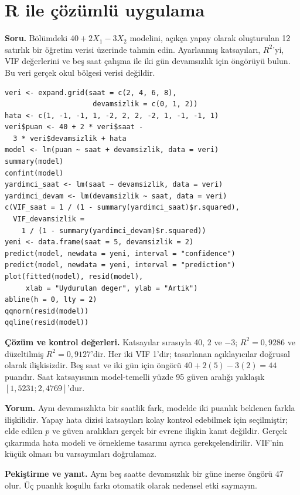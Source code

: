 \section{R ile çözümlü uygulama}
\label{sec:r-multiple}

\textbf{Soru.} Bölümdeki $40+2X_1-3X_2$ modelini, açıkça yapay olarak
oluşturulan 12 satırlık bir öğretim verisi üzerinde tahmin edin. Ayarlanmış
katsayıları, $R^2$'yi, VIF değerlerini ve beş saat çalışma ile iki gün
devamsızlık için öngörüyü bulun. Bu veri gerçek okul bölgesi verisi değildir.

\begin{lstlisting}[style=prismR]
veri <- expand.grid(saat = c(2, 4, 6, 8),
                     devamsizlik = c(0, 1, 2))
hata <- c(1, -1, -1, 1, -2, 2, 2, -2, 1, -1, -1, 1)
veri$puan <- 40 + 2 * veri$saat -
  3 * veri$devamsizlik + hata
model <- lm(puan ~ saat + devamsizlik, data = veri)
summary(model)
confint(model)
yardimci_saat <- lm(saat ~ devamsizlik, data = veri)
yardimci_devam <- lm(devamsizlik ~ saat, data = veri)
c(VIF_saat = 1 / (1 - summary(yardimci_saat)$r.squared),
  VIF_devamsizlik =
    1 / (1 - summary(yardimci_devam)$r.squared))
yeni <- data.frame(saat = 5, devamsizlik = 2)
predict(model, newdata = yeni, interval = "confidence")
predict(model, newdata = yeni, interval = "prediction")
plot(fitted(model), resid(model),
     xlab = "Uydurulan deger", ylab = "Artik")
abline(h = 0, lty = 2)
qqnorm(resid(model))
qqline(resid(model))
\end{lstlisting}

\begin{outputguidebox}
\textbf{Çözüm ve kontrol değerleri.} Katsayılar sırasıyla 40, 2 ve
$-3$; $R^2=0{,}9286$ ve düzeltilmiş $R^2=0{,}9127$'dir. Her iki VIF
1'dir; tasarlanan açıklayıcılar doğrusal olarak ilişkisizdir. Beş saat ve
iki gün için öngörü $40+2(5)-3(2)=44$ puandır. Saat katsayısının model-temelli
yüzde 95 güven aralığı yaklaşık $[1{,}5231;2{,}4769]$'dur.
\end{outputguidebox}

\textbf{Yorum.} Aynı devamsızlıkta bir saatlik fark, modelde iki puanlık
beklenen farkla ilişkilidir. Yapay hata dizisi katsayıları kolay kontrol
edebilmek için seçilmiştir; elde edilen $p$ ve güven aralıkları gerçek bir
evrene ilişkin kanıt değildir. Gerçek çıkarımda hata modeli ve örnekleme
tasarımı ayrıca gerekçelendirilir. VIF'nin küçük olması bu varsayımları doğrulamaz.

\textbf{Pekiştirme ve yanıt.} Aynı beş saatte devamsızlık bir güne inerse
öngörü 47 olur. Üç puanlık koşullu farkı otomatik olarak nedensel etki saymayın.